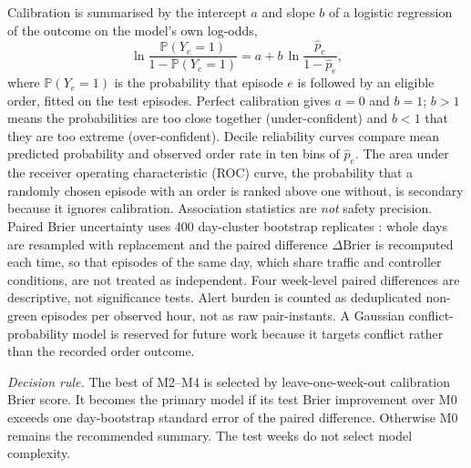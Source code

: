 \documentclass[pdflatex,sn-mathphys-num]{sn-jnl}
\begin{document}
Calibration is summarised by the intercept $a$ and slope $b$ of a logistic regression of the outcome on the model's own log-odds,
\begin{equation}\label{eq:calib}
 \ln\!\frac{\mathbb{P}(Y_e=1)}{1-\mathbb{P}(Y_e=1)}=a+b\,\ln\!\frac{\hat p_e}{1-\hat p_e},
\end{equation}
where $\mathbb{P}(Y_e=1)$ is the probability that episode $e$ is followed by an eligible order, fitted on the test episodes. Perfect calibration gives $a=0$ and $b=1$; $b>1$ means the probabilities are too close together (under-confident) and $b<1$ that they are too extreme (over-confident). Decile reliability curves compare mean predicted probability and observed order rate in ten bins of $\hat p_e$. The area under the receiver operating characteristic (ROC) curve, the probability that a randomly chosen episode with an order is ranked above one without, is secondary because it ignores calibration. Association statistics are \emph{not} safety precision. Paired Brier uncertainty uses 400 day-cluster bootstrap replicates \cite{field2007}: whole days are resampled with replacement and the paired difference $\Delta\mathrm{Brier}$ is recomputed each time, so that episodes of the same day, which share traffic and controller conditions, are not treated as independent. Four week-level paired differences are descriptive, not significance tests. Alert burden is counted as deduplicated non-green episodes per observed hour, not as raw pair-instants. A Gaussian conflict-probability model is reserved for future work because it targets conflict rather than the recorded order outcome.

\emph{Decision rule.} The best of M2--M4 is selected by leave-one-week-out calibration Brier score. It becomes the primary model if its test Brier improvement over M0 exceeds one day-bootstrap standard error of the paired difference. Otherwise M0 remains the recommended summary. The test weeks do not select model complexity.
\end{document}
